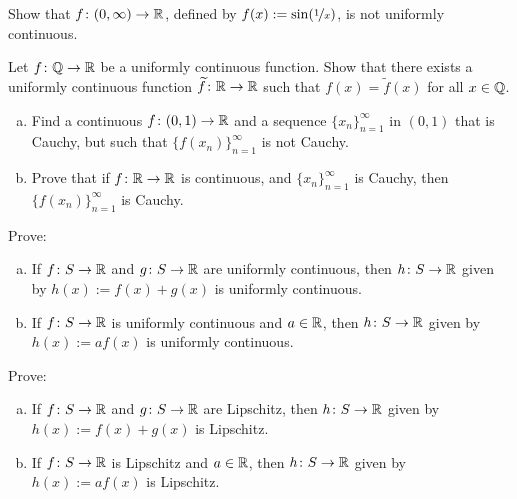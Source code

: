 \begin{exercise}
Show that $f \colon (0,\infty) \to {\mathbb{R}}$, defined by $f(x) := \sin
(\nicefrac{1}{x})$, is not uniformly continuous.
\end{exercise}

\begin{exercise}[Challenging]
Let $f \colon {\mathbb{Q}} \to {\mathbb{R}}$ be a uniformly continuous function.  Show that
there exists a uniformly continuous function $\widetilde{f} \colon {\mathbb{R}} \to {\mathbb{R}}$
such that $f(x) = \widetilde{f}(x)$ for all $x \in {\mathbb{Q}}$.
\end{exercise}

\begin{samepage}
\begin{exercise}
\leavevmode
\begin{enumerate}[a)]
\item
Find a continuous $f \colon (0,1) \to {\mathbb{R}}$ and a sequence
$\{ x_n \}_{n=1}^\infty$ in
$(0,1)$ that is Cauchy, but such that $\bigl\{ f(x_n) \bigr\}_{n=1}^\infty$ is not Cauchy.
\item
Prove that if $f \colon {\mathbb{R}} \to {\mathbb{R}}$ is continuous,
and $\{ x_n \}_{n=1}^\infty$ is
Cauchy, then $\bigl\{ f(x_n) \bigr\}_{n=1}^\infty$ is Cauchy.
\end{enumerate}
\end{exercise}
\end{samepage}

\begin{samepage}
\begin{exercise}
Prove:
\begin{enumerate}[a)]
\item
If $f \colon S \to {\mathbb{R}}$ and $g \colon S \to {\mathbb{R}}$ are uniformly continuous,
then $h \colon S \to {\mathbb{R}}$ given by $h(x) := f(x) + g(x)$
is uniformly continuous.
\item
If $f \colon S \to {\mathbb{R}}$ is uniformly continuous and $a \in {\mathbb{R}}$,
then $h \colon S \to {\mathbb{R}}$ given by $h(x) := a f(x)$
is uniformly continuous.
\end{enumerate}
\end{exercise}
\end{samepage}

\begin{exercise}
Prove:
\begin{enumerate}[a)]
\item
If $f \colon S \to {\mathbb{R}}$ and $g \colon S \to {\mathbb{R}}$ are Lipschitz,
then $h \colon S \to {\mathbb{R}}$ given by $h(x) := f(x) + g(x)$
is Lipschitz.
\item
If $f \colon S \to {\mathbb{R}}$ is Lipschitz and $a \in {\mathbb{R}}$,
then $h \colon S \to {\mathbb{R}}$ given by $h(x) := a f(x)$
is Lipschitz.
\end{enumerate}
\end{exercise}

